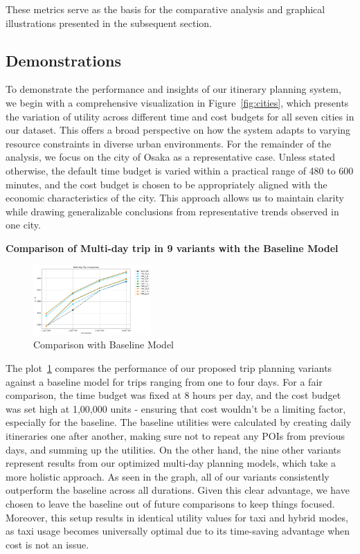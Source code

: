 
These metrics serve as the basis for the comparative analysis and graphical illustrations presented in the subsequent section.

\subsection{Demonstrations}

To demonstrate the performance and insights of our itinerary planning system, we begin with a comprehensive visualization in Figure~\ref{fig:cities}, which presents the variation of utility across different time and cost budgets for all seven cities in our dataset. This offers a broad perspective on how the system adapts to varying resource constraints in diverse urban environments. For the remainder of the analysis, we focus on the city of Osaka as a representative case. Unless stated otherwise, the default time budget is varied within a practical range of 480 to 600 minutes, and the cost budget is chosen to be appropriately aligned with the economic characteristics of the city. This approach allows us to maintain clarity while drawing generalizable conclusions from representative trends observed in one city.

\newpage
\noindent \textbf{Comparison of Multi-day trip in 9 variants with the Baseline Model}
\begin{figure}[H]
\centering
\includegraphics[width=0.4\textwidth]{plots/baselineComparison.png}
\caption{Comparison with Baseline Model}
\label{fig:comparisonWithBaselinePlot}
\end{figure}

The plot~\ref{fig:comparisonWithBaselinePlot} compares the performance of our proposed trip planning variants against a baseline model for trips ranging from one to four days. For a fair comparison, the time budget was fixed at 8 hours per day, and the cost budget was set high at 1,00,000 units - ensuring that cost wouldn’t be a limiting factor, especially for the baseline. The baseline utilities were calculated by creating daily itineraries one after another, making sure not to repeat any POIs from previous days, and summing up the utilities. On the other hand, the nine other variants represent results from our optimized multi-day planning models, which take a more holistic approach. As seen in the graph, all of our variants consistently outperform the baseline across all durations. Given this clear advantage, we have chosen to leave the baseline out of future comparisons to keep things focused. Moreover, this setup results in identical utility values for taxi and hybrid modes, as taxi usage becomes universally optimal due to its time-saving advantage when cost is not an issue. \\

